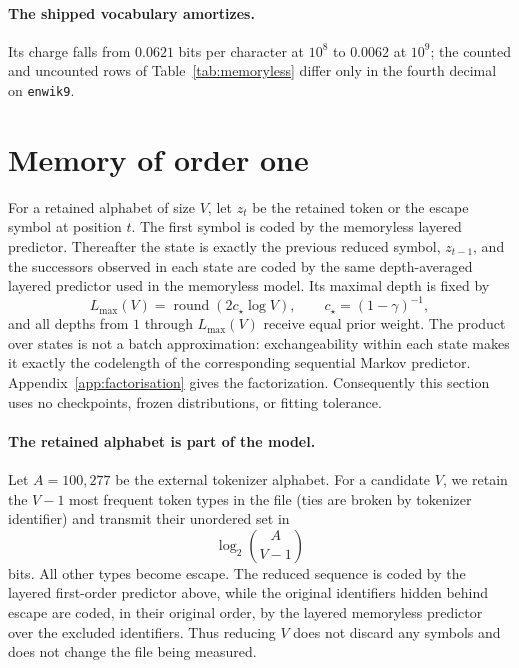 \documentclass[11pt]{article}
\begin{document}
\paragraph{The shipped vocabulary amortizes.}  Its charge falls from
$0.0621$ bits per character at $10^8$ to $0.0062$ at $10^9$; the
counted and uncounted rows of Table~\ref{tab:memoryless} differ only
in the fourth decimal on \texttt{enwik9}.

\section{Memory of order one}
\label{sec:firstorder}

For a retained alphabet of size $V$, let $z_t$ be the retained token or
the escape symbol at position $t$.  The first symbol is coded by the
memoryless layered predictor.  Thereafter the state is exactly the previous
reduced symbol, $z_{t-1}$, and the successors observed in each state are
coded by the same depth-averaged layered predictor used in the memoryless
model.  Its maximal depth is fixed by
\[
 L_{\max}(V)=\operatorname{round}\!\left(2c_\star\log V\right),
 \qquad c_\star=(1-\gamma)^{-1},
\]
and all depths from $1$ through $L_{\max}(V)$ receive equal prior weight.
The product over states is not a batch approximation: exchangeability within
each state makes it exactly the codelength of the corresponding sequential
Markov predictor.  Appendix~\ref{app:factorisation} gives the factorization.
Consequently this section uses no checkpoints, frozen distributions, or
fitting tolerance.

\paragraph{The retained alphabet is part of the model.}
Let $A=100{,}277$ be the external tokenizer alphabet.  For a candidate $V$,
we retain the $V-1$ most frequent token types in the file (ties are broken by
tokenizer identifier) and transmit their unordered set in
\[
 \log_2 \binom{A}{V-1}
\]
bits.  All other types become escape.  The reduced sequence is coded by the
layered first-order predictor above, while the original identifiers hidden
behind escape are coded, in their original order, by the layered memoryless
predictor over the excluded identifiers.  Thus reducing $V$ does not discard
any symbols and does not change the file being measured.
\end{document}

